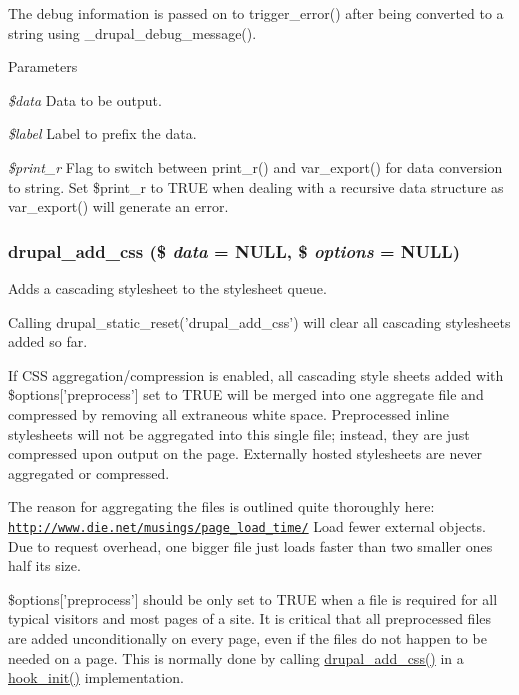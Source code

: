 The debug information is passed on to trigger\_\-error() after being converted to a string using \_\-drupal\_\-debug\_\-message().


\begin{DoxyParams}{Parameters}
\item[{\em \$data}]Data to be output. \item[{\em \$label}]Label to prefix the data. \item[{\em \$print\_\-r}]Flag to switch between print\_\-r() and var\_\-export() for data conversion to string. Set \$print\_\-r to TRUE when dealing with a recursive data structure as var\_\-export() will generate an error. \end{DoxyParams}
\hypertarget{common_8inc_a2c5bb2667efb44b02f1a105c0bfdebe5}{
\subsubsection[{drupal\_\-add\_\-css}]{\setlength{\rightskip}{0pt plus 5cm}drupal\_\-add\_\-css (\$ {\em data} = {\ttfamily NULL}, \/  \$ {\em options} = {\ttfamily NULL})}}
\label{common_8inc_a2c5bb2667efb44b02f1a105c0bfdebe5}
Adds a cascading stylesheet to the stylesheet queue.

Calling drupal\_\-static\_\-reset('drupal\_\-add\_\-css') will clear all cascading stylesheets added so far.

If CSS aggregation/compression is enabled, all cascading style sheets added with \$options\mbox{[}'preprocess'\mbox{]} set to TRUE will be merged into one aggregate file and compressed by removing all extraneous white space. Preprocessed inline stylesheets will not be aggregated into this single file; instead, they are just compressed upon output on the page. Externally hosted stylesheets are never aggregated or compressed.

The reason for aggregating the files is outlined quite thoroughly here: \href{http://www.die.net/musings/page_load_time/}{\tt http://www.die.net/musings/page\_\-load\_\-time/} Load fewer external objects. Due to request overhead, one bigger file just loads faster than two smaller ones half its size.

\$options\mbox{[}'preprocess'\mbox{]} should be only set to TRUE when a file is required for all typical visitors and most pages of a site. It is critical that all preprocessed files are added unconditionally on every page, even if the files do not happen to be needed on a page. This is normally done by calling \hyperlink{common_8inc_a2c5bb2667efb44b02f1a105c0bfdebe5}{drupal\_\-add\_\-css()} in a \hyperlink{group__hooks_ga74edef0c463436fdbb1f92ef367db051}{hook\_\-init()} implementation.

